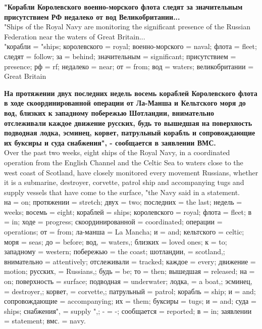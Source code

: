 {\bf "Корабли Королевского военно-морского флота следят за значительным присутствием РФ недалеко от вод Великобритании...}\\
"Ships of the Royal Navy are monitoring the significant presence of the Russian Federation near the waters of Great Britain...\\
{\color{darkgreen} "корабли = "ships; королевского = royal; военно-морского = naval; флота = fleet; следят = follow; за = behind; значительным = significant; присутствием = presence; рф = rf; недалеко = near; от = from; вод = waters; великобритании = Great Britain }

{\bf На протяжении двух последних недель восемь кораблей Королевского флота в ходе скоординированной операции от Ла-Манша и Кельтского моря до вод, близких к западному побережью Шотландии, внимательно отслеживали каждое движение русских, будь то вышедшая на поверхность подводная лодка, эсминец, корвет, патрульный корабль и сопровождающие их буксиры и суда снабжения", - сообщается в заявлении ВМС. }\\
Over the past two weeks, eight ships of the Royal Navy, in a coordinated operation from the English Channel and the Celtic Sea to waters close to the west coast of Scotland, have closely monitored every movement Russians, whether it is a submarine, destroyer, corvette, patrol ship and accompanying tugs and supply vessels that have come to the surface, "the Navy said in a statement.\\
{\color{darkgreen} на = on; протяжении = stretch; двух = two; последних = the last; недель = weeks; восемь = eight; кораблей = ships; королевского = royal; флота = fleet; в = in; ходе = progress; скоординированной = coordinated; операции = operations; от = from; ла-манша = La Mancha; и = and; кельтского = celtic; моря = seas; до = before; вод, = waters,; близких = loved ones; к = to; западному = western; побережью = the coast; шотландии, = scotland,; внимательно = attentively; отслеживали = tracked; каждое = every; движение = motion; русских, = Russians,; будь = be; то = then; вышедшая = released; на = on; поверхность = surface; подводная = underwater; лодка, = a boat,; эсминец, = destroyer,; корвет, = corvette,; патрульный = patrol; корабль = ship; и = and; сопровождающие = accompanying; их = them; буксиры = tugs; и = and; суда = ships; снабжения", = supply ",; - = -; сообщается = reported; в = in; заявлении = statement; вмс. = navy.}

